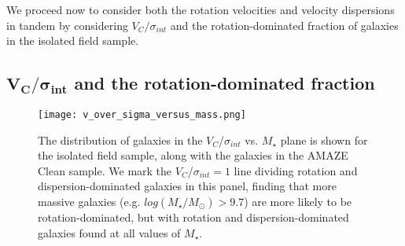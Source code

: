 \documentclass[fleqn,usenatbib]{mn2e}
\begin{document}
We proceed now to consider both the rotation velocities and velocity dispersions in tandem by considering $V_{C}/\sigma_{int}$ and the rotation-dominated fraction of galaxies in the isolated field sample.


\subsection{$\boldsymbol{V_{C}/\sigma_{int}}$ and the rotation-dominated fraction}\label{subsec:rdf_v_over_sigma}

\begin{figure}
    \centering \hspace{-1.13cm}
    \texttt{[image: v\_over\_sigma\_versus\_mass.png]}
    \caption{The distribution of galaxies in the $V_{C}$/$\sigma_{int}$ vs. $M_{\star}$ plane is shown for the isolated field sample, along with the galaxies in the AMAZE Clean sample.
    We mark the $V_{C}$/$\sigma_{int}=1$ line dividing rotation and dispersion-dominated galaxies in this panel, finding that more massive galaxies (e.g. $log(M_{\star}/M_{\odot}) > 9.7$) are more likely to be rotation-dominated, but with rotation and dispersion-dominated galaxies found at all values of $M_{\star}$.}
    \label{fig:v_sig_and_v}
\end{figure}
\end{document}

